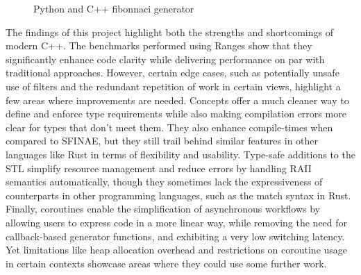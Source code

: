 \documentclass[
    english, %
]{VUMIFPSkursinis}
\begin{document}
\begin{figure}[!htbp]
    \begin{minipage}{0.4\textwidth}
        \centering
    \end{minipage}
    \begin{minipage}{0.6\textwidth}
        \centering
    \end{minipage}
    \caption{Python and C++ fibonnaci generator}
    \label{fig:endless_fib}
\end{figure}


\FloatBarrier
{}



The findings of this project highlight both the strengths and shortcomings of modern C++. The benchmarks performed using Ranges show that they significantly enhance code clarity while delivering performance on par with traditional approaches. However, certain edge cases, such as potentially unsafe use of filters and the redundant repetition of work in certain views, highlight a few areas where improvements are needed. Concepts offer a much cleaner way to define and enforce type requirements while also making compilation errors more clear for types that don't meet them. They also enhance compile-times when compared to SFINAE, but they still trail behind similar features in other languages like Rust in terms of flexibility and usability. Type-safe additions to the STL simplify resource management and reduce errors by handling RAII semantics automatically, though they sometimes lack the expressiveness of counterparts in other programming languages, such as the match syntax in Rust. Finally, coroutines enable the simplification of asynchronous workflows by allowing users to express code in a more linear way, while removing the need for callback-based generator functions, and exhibiting a very low switching latency. Yet limitations like heap allocation overhead and restrictions on coroutine usage in certain contexts showcase areas where they could use some further work.
\end{document}

